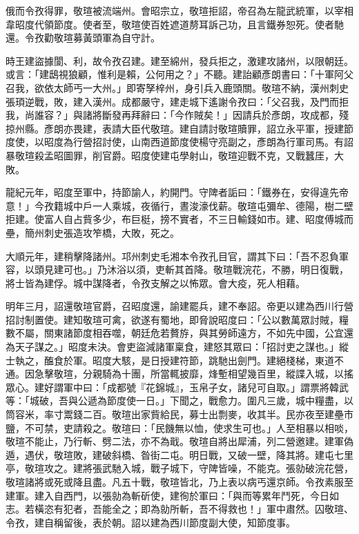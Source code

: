 \begin{pinyinscope}
 俄而令孜得罪，敬瑄被流端州。會昭宗立，敬瑄拒詔，帝召為左龍武統軍，以宰相韋昭度代領節度。使者至，敬瑄使百姓遮道剺耳訴己功，且言鐵券恕死。使者馳還。令孜勸敬瑄募黃頭軍為自守計。



 時王建盜據閬、利，故令孜召建。建至綿州，發兵拒之，激建攻諸州，以限朝廷。或言：「建鴟視狼顧，惟利是賴，公何用之？」不聽。建詒顧彥朗書曰：「十軍阿父召我，欲依太師丐一大州。」即寄孥梓州，身引兵入鹿頭關。敬瑄不納，漢州刺史張頊逆戰，敗，建入漢州。成都嚴守，建走城下遙謝令孜曰：「父召我，及門而拒我，尚誰容？」與諸將斷發再拜辭曰：「今作賊矣！」因請兵於彥朗，攻成都，殘掠州縣。彥朗亦畏建，表請大臣代敬瑄。建自請討敬瑄贖罪，詔立永平軍，授建節度使，以昭度為行營招討使，山南西道節度使楊守亮副之，彥朗為行軍司馬。有詔暴敬瑄殺孟昭圖罪，削官爵。昭度使建屯學射山，敬瑄迎戰不克，又戰蠶厓，大敗。



 龍紀元年，昭度至軍中，持節諭人，約開門。守陴者詬曰：「鐵券在，安得違先帝意！」今孜籍城中戶一人乘城，夜循行，晝浚濠伐薪。敬瑄屯彌牟、德陽，樹二壁拒建。使富人自占貲多少，布巨梃，搒不實者，不三日輸錢如市。建、昭度傅城而壘，簡州刺史張造攻笮橋，大敗，死之。



 大順元年，建稍擊降諸州。邛州刺史毛湘本令孜孔目官，謂其下曰：「吾不忍負軍容，以頭見建可也。」乃沐浴以須，吏斬其首降。敬瑄戰浣花，不勝，明日復戰，將士皆為建俘。城中謀降者，令孜支解之以怖眾。會大疫，死人相藉。



 明年三月，詔還敬瑄官爵，召昭度還，諭建罷兵，建不奉詔。帝更以建為西川行營招討制置使。建知敬瑄可禽，欲遂有蜀地，即脅說昭度曰：「公以數萬眾討賊，糧數不屬，關東諸節度相吞噬，朝廷危若贅斿，與其勞師遠方，不如先中國，公宜還為天子謀之。」昭度未決。會吏盜減諸軍稟食，建怒其眾曰：「招討吏之謀也。」縱士執之，醢食於軍。昭度大駭，是日授建符節，跳馳出劍門。建絕棧梯，東道不通。因急擊敬瑄，分親騎為十團，所當輒披靡，烽塹相望幾百里，縱諜入城，以搖眾心。建好謂軍中曰：「成都號『花錦城』，玉帛子女，諸兒可自取。」謂票將韓武等：「城破，吾與公遞為節度使一日。」下聞之，戰愈力。圍凡三歲，城中糧盡，以筒容米，率寸鬻錢二百。敬瑄出家貲給民，募士出剽麥，收其半。民亦夜至建壘市鹽，不可禁，吏請殺之。敬瑄曰：「民饑無以恤，使求生可也。」人至相暴以相啖，敬瑄不能止，乃行斬、劈二法，亦不為戢。敬瑄自將出犀浦，列二營邀建。建軍偽遁，遇伏，敬瑄敗，建破斜橋、昝街二屯。明日戰，又破一壁，降其將。建屯七里亭，敬瑄攻之。建將張武馳入城，戰子城下，守陴皆噪，不能克。張勍破浣花營，敬瑄諸將或死或降且盡。凡五十戰，敬瑄皆北，乃上表以病丐還京師。令孜素服至建軍。建入自西門，以張勍為斬斫使，建徇於軍曰：「與而等累年鬥死，今日如志。若橫恣有犯者，吾能全之；即為勍所斬，吾不得救也！」軍中肅然。囚敬瑄、令孜，建自稱留後，表於朝。詔以建為西川節度副大使，知節度事。




\end{pinyinscope}
